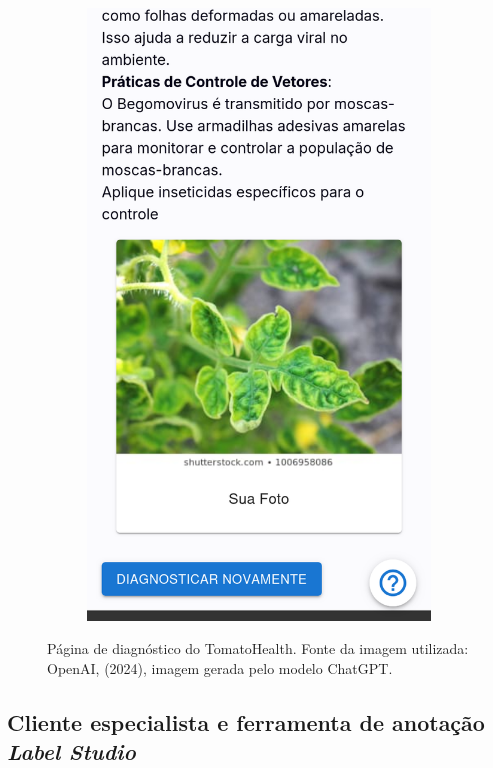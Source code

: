 \begin{figure}[htp]
\begin{subfigure}{0.3\textwidth}
        \includegraphics[width=\linewidth, height=0.4\textheight, keepaspectratio]{images/diagnostic6.png}
    \end{subfigure}
    
    \caption{Página de diagnóstico do TomatoHealth. Fonte da imagem utilizada: OpenAI, (2024), imagem gerada pelo modelo ChatGPT.}        
    \label{fig:diagnostic}
\end{figure}


\subsection{Cliente especialista e ferramenta de anotação \emph{Label Studio}}

